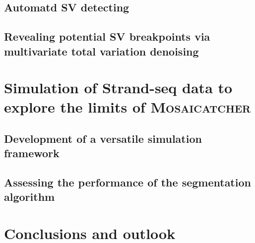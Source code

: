 \subsection{Automatd SV detecting}
\label{sec:mosaic_method}



\subsection{Revealing potential SV breakpoints via multivariate total variation denoising}
\label{sec:mosaic_segmentation}


\FloatBarrier
\section{Simulation of Strand-seq data to explore the limits of \textsc{Mosaicatcher}}
\label{sec:mosaic_simul}

\subsection{Development of a versatile simulation framework}

\subsection{Assessing the performance of the segmentation algorithm}

\section{Conclusions and outlook}
\label{sec:mosaic_conclusion}



